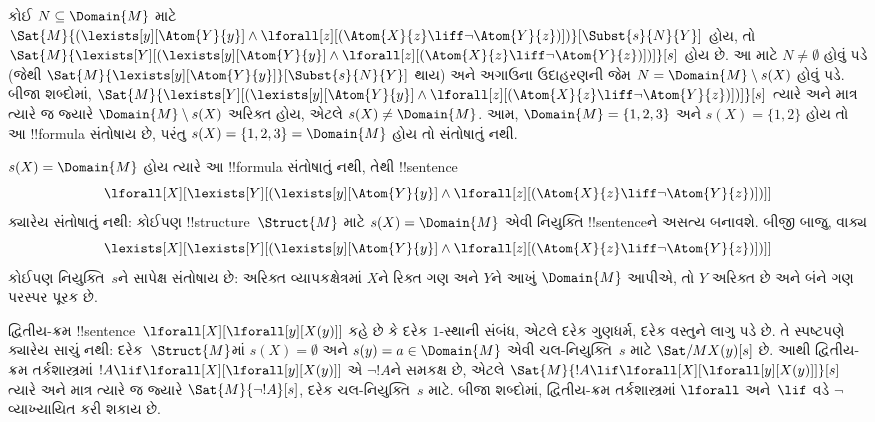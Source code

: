 \documentclass[../../../include/open-logic-section]{subfiles}
\begin{document}
\begin{ex}
  કોઈ $N \subseteq \Domain{M}$ માટે
  $\Sat{M}{(\lexists[y][\Atom{Y}{y}] \land \lforall[z][(\Atom{X}{z}
  \liff \lnot \Atom{Y}{z})])}[\Subst{s}{N}{Y}]$ હોય, તો
  $\Sat{M}{\lexists[Y][(\lexists[y][\Atom{Y}{y}] \land
  \lforall[z][(\Atom{X}{z} \liff \lnot \Atom{Y}{z})])]}[s]$ હોય છે.
  આ માટે $N \neq \emptyset$ હોવું પડે (જેથી
  $\Sat{M}{\lexists[y][\Atom{Y}{y}]}[\Subst{s}{N}{Y}]$ થાય) અને
  અગાઉના ઉદાહરણની જેમ $N = \Domain{M} \setminus s(X)$ હોવું પડે.
  બીજા શબ્દોમાં,
  $\Sat{M}{\lexists[Y][(\lexists[y][\Atom{Y}{y}] \land
  \lforall[z][(\Atom{X}{z} \liff \lnot \Atom{Y}{z})])]}[s]$
  ત્યારે અને માત્ર ત્યારે જ જ્યારે $\Domain{M} \setminus s(X)$
  અરિક્ત હોય, એટલે $s(X) \neq \Domain{M}$. આમ,
  $\Domain{M} = \{1, 2, 3\}$ અને $s(X) = \{1, 2\}$ હોય તો આ
  !!{formula} સંતોષાય છે, પરંતુ $s(X) = \{1, 2, 3\} = \Domain{M}$
  હોય તો સંતોષાતું નથી.

  $s(X) = \Domain{M}$ હોય ત્યારે આ !!{formula} સંતોષાતું નથી, તેથી
  !!{sentence}
  \[
  \lforall[X][\lexists[Y][(\lexists[y][\Atom{Y}{y}] \land
      \lforall[z][(\Atom{X}{z} \liff \lnot \Atom{Y}{z})])]]
  \]
  ક્યારેય સંતોષાતું નથી: કોઈપણ !!{structure}~$\Struct{M}$ માટે
  $s(X) = \Domain{M}$ એવી નિયુક્તિ !!{sentence}ને અસત્ય બનાવશે.
  બીજી બાજુ, વાક્ય
  \[
  \lexists[X][\lexists[Y][(\lexists[y][\Atom{Y}{y}] \land
      \lforall[z][(\Atom{X}{z} \liff \lnot \Atom{Y}{z})])]]
  \]
  કોઈપણ નિયુક્તિ~$s$ને સાપેક્ષ સંતોષાય છે: અરિક્ત વ્યાપકક્ષેત્રમાં
  $X$ને રિક્ત ગણ અને $Y$ને આખું $\Domain{M}$ આપીએ, તો
  $Y$ અરિક્ત છે અને બંને ગણ પરસ્પર પૂરક છે.
\end{ex}

\begin{ex}
  દ્વિતીય-ક્રમ !!{sentence}~$\lforall[X][\lforall[y][X(y)]]$ કહે છે
  કે દરેક $1$-સ્થાની સંબંધ, એટલે દરેક ગુણધર્મ, દરેક વસ્તુને લાગુ પડે
  છે. તે સ્પષ્ટપણે ક્યારેય સાચું નથી: દરેક~$\Struct{M}$માં
  $s(X) = \emptyset$ અને $s(y) = a \in \Domain{M}$ એવી
  ચલ-નિયુક્તિ~$s$ માટે $\Sat/{M}{X(y)}[s]$ છે. આથી દ્વિતીય-ક્રમ
  તર્કશાસ્ત્રમાં $!A \lif \lforall[X][\lforall[y][X(y)]]$ એ
  $\lnot !A$ને સમકક્ષ છે, એટલે
  $\Sat{M}{!A \lif
  \lforall[X][\lforall[y][X(y)]]}[s]$ ત્યારે અને માત્ર ત્યારે જ
  જ્યારે $\Sat{M}{\lnot !A}[s]$, દરેક ચલ-નિયુક્તિ~$s$ માટે.
  બીજા શબ્દોમાં, દ્વિતીય-ક્રમ
  તર્કશાસ્ત્રમાં $\lforall$ અને~$\lif$ વડે $\lnot$ વ્યાખ્યાયિત
  કરી શકાય છે.
\end{ex}
\end{document}
